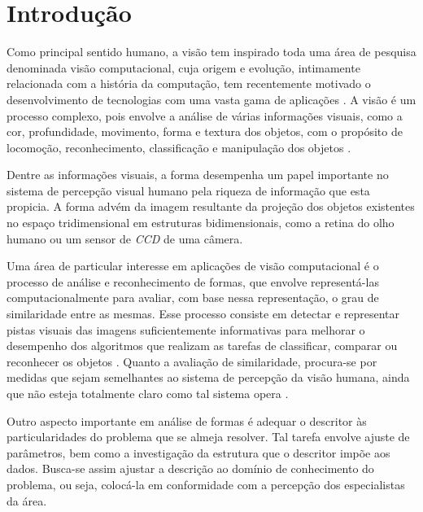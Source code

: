 
\chapter{Introdução \label{chap:INTRO}}


Como principal sentido humano, a visão tem inspirado toda uma área de pesquisa denominada visão computacional, cuja origem e evolução, intimamente relacionada com a história da computação, tem recentemente motivado o desenvolvimento de tecnologias com uma vasta gama de aplicações \cite{Costa:2009}. A visão é um processo complexo, pois envolve a análise de várias informações visuais, como a cor, profundidade, movimento, forma e textura dos objetos, com o propósito de locomoção, reconhecimento, classificação e manipulação dos objetos \cite{Ullman:1996}.

Dentre as informações visuais, a forma desempenha um papel importante no sistema de percepção visual humano pela riqueza de informação que esta propicia. A forma advém da imagem resultante da projeção dos objetos existentes no espaço tridimensional em estruturas bidimensionais, como a retina do olho humano ou um sensor de \emph{CCD} de uma câmera.

Uma área de particular interesse em aplicações de visão computacional é o processo de análise e reconhecimento de formas, que envolve representá-las computacionalmente para avaliar, com base nessa representação, o grau de similaridade entre as mesmas. Esse processo consiste em detectar e representar pistas visuais das imagens suficientemente informativas para melhorar o desempenho dos algoritmos que realizam as tarefas de classificar, comparar ou reconhecer os objetos \cite{Escolano:2009}. Quanto a avaliação de similaridade, procura-se por medidas que sejam semelhantes ao sistema de percepção da visão humana, ainda que não esteja totalmente claro como tal sistema opera \cite{4815272}. 

Outro aspecto importante em análise de formas é adequar o descritor às particularidades do problema que se almeja resolver. Tal tarefa envolve ajuste de parâmetros, bem como a investigação da estrutura que o descritor impõe aos dados. Busca-se assim ajustar a descrição ao domínio de conhecimento do problema, ou seja, colocá-la em conformidade com a percepção dos especialistas da área. 

